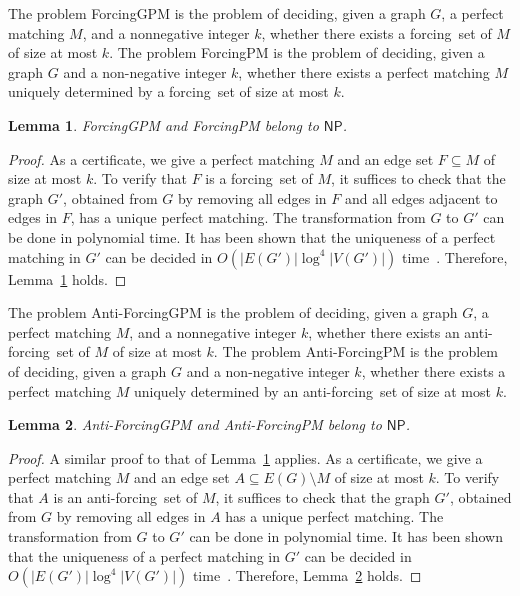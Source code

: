 \documentclass[a4paper,10pt]{article}
\newtheorem{lemma}{Lemma}
\newcommand{\NP}{$\mathsf{NP}$}
\newcommand{\FS}{\rm forcing~set}
\newcommand{\AFS}{\rm anti-forcing~set}
\newcommand{\FGPM}{\sc ForcingGPM} %
\newcommand{\AFGPM}{\sc Anti-ForcingGPM}
\newcommand{\FPM}{\sc ForcingPM} %
\newcommand{\AFPM}{\sc Anti-ForcingPM}
\begin{document}
The problem {\FGPM} is the problem of deciding, given a graph $G$, a perfect matching $M$, and a nonnegative integer $k$, whether there exists a {\FS} of $M$ of size at most $k$.
The problem {\FPM} is the problem of deciding, given a graph $G$ and a non-negative integer $k$, whether there exists a perfect matching $M$ uniquely determined by a {\FS} of size at most $k$.

\begin{lemma} \label{lem:FPM_in_NP}
    {\FGPM} and {\FPM} belong to {\NP}.
\end{lemma}

\begin{proof}
    As a certificate, we give a perfect matching $M$ and an edge set $F \subseteq M$ of size at most $k$.
    To verify that $F$ is a {\FS} of $M$, it suffices to check that the graph $G'$, obtained from $G$ by removing all edges in $F$ and all edges adjacent to edges in $F$, has a unique perfect matching.
    The transformation from $G$ to $G'$ can be done in polynomial time.
    It has been shown that the uniqueness of a perfect matching in $G'$ can be decided in $O(|E(G')| \log^4 |V(G')|)$ time~\cite{gabow1999unique}.
    Therefore, Lemma~\ref{lem:FPM_in_NP} holds.
\end{proof}

The problem {\AFGPM} is the problem of deciding, given a graph $G$, a perfect matching $M$, and a nonnegative integer $k$, whether there exists an {\AFS} of $M$ of size at most $k$.
The problem {\AFPM} is the problem of deciding, given a graph $G$ and a non-negative integer $k$, whether there exists a perfect matching $M$ uniquely determined by an {\AFS} of size at most $k$.

\begin{lemma} \label{lem:AFPM_in_NP}
    {\AFGPM} and {\AFPM} belong to {\NP}.
\end{lemma}

\begin{proof}
    A similar proof to that of Lemma~\ref{lem:FPM_in_NP} applies.
    As a certificate, we give a perfect matching $M$ and an edge set $A \subseteq E(G) \setminus M$ of size at most $k$.
    To verify that $A$ is an {\AFS} of $M$, it suffices to check that the graph $G'$, obtained from $G$ by removing all edges in $A$ has a unique perfect matching.
    The transformation from $G$ to $G'$ can be done in polynomial time.
    It has been shown that the uniqueness of a perfect matching in $G'$ can be decided in $O(|E(G')| \log^4 |V(G')|)$ time~\cite{gabow1999unique}.
    Therefore, Lemma~\ref{lem:AFPM_in_NP} holds.
\end{proof}
\end{document}
